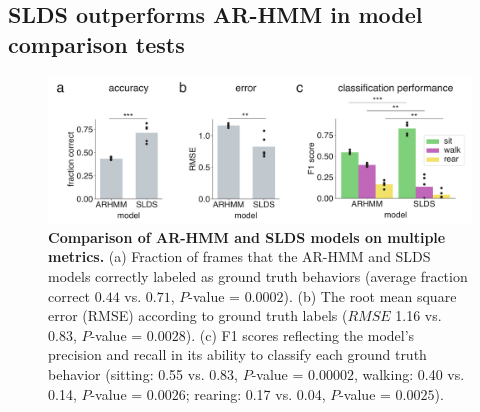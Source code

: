\subsection{SLDS outperforms AR-HMM in model comparison tests}
\label{sec:slds:3.2.4}

\begin{figure}[t!]
  \begin{center}
    \includegraphics[width=0.90\linewidth]{ch3-slds/slds-figures/Fig4.pdf}
    \caption[Comparison of AR-HMM and SLDS models on multiple metrics]{\textbf{Comparison of AR-HMM and SLDS models on multiple metrics.} (a) Fraction of frames that the AR-HMM and SLDS models correctly labeled as ground truth behaviors (average fraction correct $0.44$ vs. $0.71$, $P$-value = $0.0002$). (b) The root mean square error (RMSE) according to ground truth labels ($RMSE$ 1.16 vs. 0.83, $P$-value = $0.0028$). (c) F1 scores reflecting the model's precision and recall in its ability to classify each ground truth behavior (sitting: 0.55 vs. 0.83, $P$-value = $0.00002$, walking: 0.40 vs. 0.14, $P$-value = $0.0026$; rearing: 0.17 vs. 0.04, $P$-value = $0.0025$). }
    \label{fig:slds:4}
  \end{center}
  \vspace{-0.5cm}
\end{figure}
